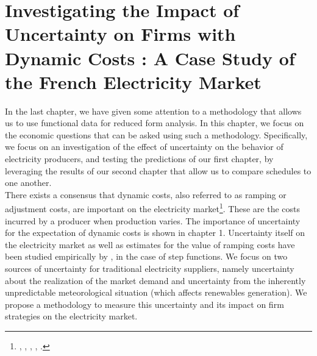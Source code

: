 

\renewcommand{\thesection}{\arabic{chapter}.\arabic{section}}


\chapter{Investigating the Impact of Uncertainty on Firms with Dynamic Costs : A Case Study of the French Electricity Market}
\label{chap:ch2}
\cleardoublepage

\doublespacing
In the last chapter, we have given some attention to a methodology that allows us to use functional data for reduced form analysis. In this chapter, we focus on the economic questions that can be asked using such a methodology. Specifically, we focus on an investigation of the effect of uncertainty on the behavior of electricity producers, and testing the predictions of our first chapter, by leveraging the results of our second chapter that allow us to compare schedules to one another. \\

There exists a consensus that dynamic costs, also referred to as ramping or adjustment costs, are important on the electricity market\footnote{ \cite{anderson2005supply},  \cite{hobbs2001next}, \cite{hortacsu2008understanding}, \cite{reguant2011welfare}, \cite{sewalt2003negative}. }. These are the costs incurred by a producer when production varies. 
The importance of uncertainty for the expectation of dynamic costs is shown in chapter 1. Uncertainty itself on the electricity market as well as estimates for the value of ramping costs have been studied empirically by \cite{wolak2007quantifying}, in the case of step functions. %
We focus on two sources of uncertainty for traditional electricity suppliers, namely uncertainty about the realization of the market demand and uncertainty from the inherently unpredictable meteorological situation
(which affects renewables generation). 
We propose a methodology to measure this uncertainty and its impact on firm strategies on the electricity market. %

